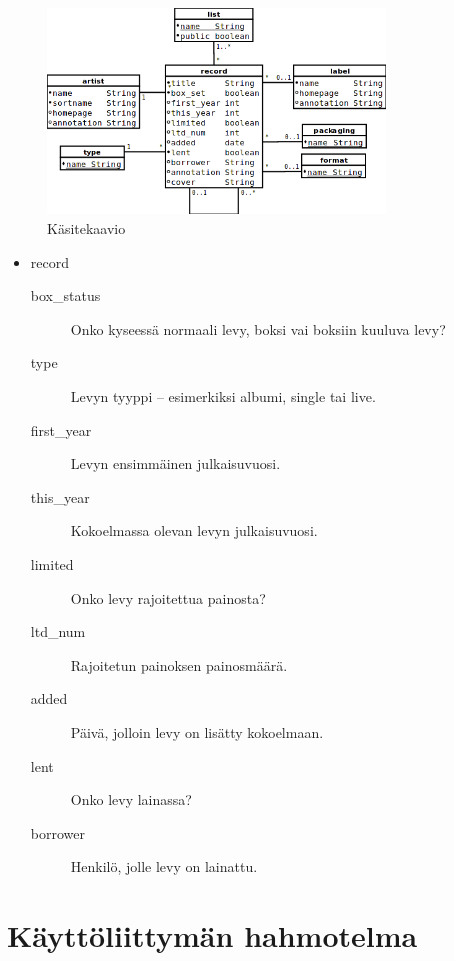\documentclass[a4paper,12pt]{report}
\begin{document}
\begin{figure}[H]
  \begin{center}
    \includegraphics[width=0.8\textwidth]{diagrams/kasitekaavio}
  \end{center}
  \caption{Käsitekaavio}
\end{figure}

\begin{itemize}
\item record
\begin{description}
\item[box\_status] Onko kyseessä normaali levy, boksi vai boksiin kuuluva levy?
\item[type] Levyn tyyppi -- esimerkiksi albumi, single tai live.
\item[first\_year] Levyn ensimmäinen julkaisuvuosi.
\item[this\_year] Kokoelmassa olevan levyn julkaisuvuosi.
\item[limited] Onko levy rajoitettua painosta?
\item[ltd\_num] Rajoitetun painoksen painosmäärä.
\item[added] Päivä, jolloin levy on lisätty kokoelmaan.
\item[lent] Onko levy lainassa?
\item[borrower] Henkilö, jolle levy on lainattu.
\end{description}
\end{itemize}

\section{Käyttöliittymän hahmotelma}
\end{document}
